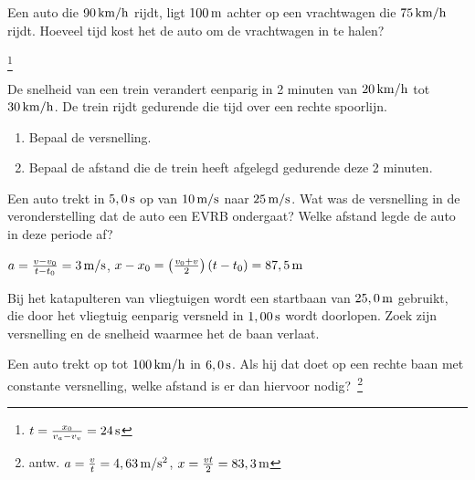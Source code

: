 \begin{exercise} Een auto die $90\rm\,km/h$ rijdt, ligt $100\rm\,m$ achter op een vrachtwagen die $75\rm\,km/h$ rijdt. Hoeveel tijd kost het de auto om de vrachtwagen in te halen? 
\begin{oplossing}
\footnote{$t=\frac{x_0}{v_a-v_v}=24\rm\,s$}
\end{oplossing}

\end{exercise}

\begin{exercise} De snelheid van een trein verandert eenparig in 2 minuten van $20\rm\,km/h$ tot $30\rm\,km/h$. De trein rijdt gedurende die tijd over een rechte spoorlijn.
\begin{enumerate}
    \item Bepaal de versnelling.
    \item Bepaal de afstand die de trein heeft afgelegd gedurende deze 2 minuten.
\end{enumerate}

\end{exercise}

\begin{exercise} Een auto trekt in $5,0\rm\,s$ op van $10\rm\,m/s$ naar $25\rm\,m/s$. Wat was de versnelling in de veronderstelling dat de auto een EVRB ondergaat? Welke afstand legde de auto in deze periode af?
\begin{oplossing}
\newline
$a=\frac{v-v_0}{t-t_0}=3\rm\,m/s$,
$x-x_0=\left(\frac{v_0+v}{2}\right)(t-t_0)=87,5\rm\,m$
\end{oplossing}

\end{exercise}

\begin{exercise} Bij het katapulteren van vliegtuigen wordt een startbaan van
$25,0\rm\,m$ gebruikt, die door het vliegtuig eenparig versneld in
$1,00\rm\,s$ wordt doorlopen. Zoek zijn versnelling en de snelheid
waarmee het de baan verlaat.

\end{exercise}

\begin{exercise} Een auto trekt op tot $100\rm\,km/h$ in $6,0\rm\,s$. Als hij
dat doet op een rechte baan met constante versnelling, welke afstand
is er dan hiervoor nodig?~\footnote{antw.
$a=\frac{v}{t}=4,63\rm\,m/s^2$, $x=\frac{vt}{2}=83,3\rm\,m$}

\end{exercise}

